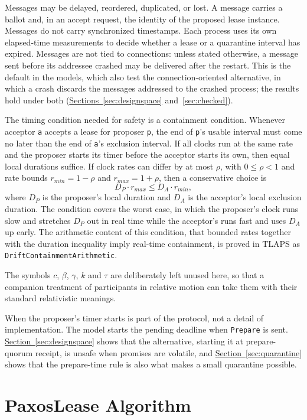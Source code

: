 \documentclass[final,5p,times,twocolumn,number]{elsarticle}
\newcommand{\code}[1]{\texttt{#1}}
\newcommand{\secref}[1]{\hyperref[#1]{Section~\ref*{#1}}}
\newcommand{\secsref}[2]{\hyperref[#1]{Sections~\ref*{#1}} and~\hyperref[#2]{\ref*{#2}}}
\begin{document}
Messages may be delayed, reordered, duplicated, or lost.  A message carries a ballot and, in an accept request, the identity of the proposed lease instance.  Messages do not carry synchronized timestamps.  Each process uses its own elapsed-time measurements to decide whether a lease or a quarantine interval has expired.  Messages are not tied to connections: unless stated otherwise, a message sent before its addressee crashed may be delivered after the restart.  This is the default in the models, which also test the connection-oriented alternative, in which a crash discards the messages addressed to the crashed process; the results hold under both (\secsref{sec:designspace}{sec:checked}).

The timing condition needed for safety is a containment condition.  Whenever acceptor \code{a} accepts a lease for proposer \code{p}, the end of \code{p}'s usable interval must come no later than the end of \code{a}'s exclusion interval.  If all clocks run at the same rate and the proposer starts its timer before the acceptor starts its own, then equal local durations suffice.  If clock rates can differ by at most $\rho$, with $0 \leq \rho < 1$ and rate bounds $r_{min} = 1-\rho$ and $r_{max} = 1+\rho$, then a conservative choice is
\[
  D_P \cdot r_{max} \leq D_A \cdot r_{min},
\]
where $D_P$ is the proposer's local duration and $D_A$ is the acceptor's local exclusion duration.  The condition covers the worst case, in which the proposer's clock runs slow and stretches $D_P$ out in real time while the acceptor's runs fast and uses $D_A$ up early.  The arithmetic content of this condition, that bounded rates together with the duration inequality imply real-time containment, is proved in TLAPS as \code{DriftContainmentArithmetic}.

The symbols $c$, $\beta$, $\gamma$, $k$ and $\tau$ are deliberately left unused here, so that a companion treatment of participants in relative motion can take them with their standard relativistic meanings.

When the proposer's timer starts is part of the protocol, not a detail of implementation.  The model starts the pending deadline when \code{Prepare} is sent.  \secref{sec:designspace} shows that the alternative, starting it at prepare-quorum receipt, is unsafe when promises are volatile, and \secref{sec:quarantine} shows that the prepare-time rule is also what makes a small quarantine possible.

\section{PaxosLease Algorithm}\label{sec:algorithm}
\end{document}
